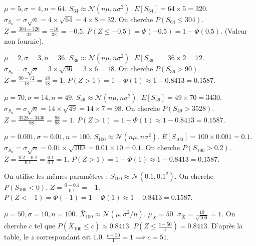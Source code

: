 \begin{correctionbox}
$\mu=5, \sigma=4, n=64$. $S_{64} \approx \mathcal{N}(n\mu, n\sigma^2)$.
$E[S_{64}] = 64 \times 5 = 320$.
$\sigma_{S_n} = \sigma\sqrt{n} = 4 \times \sqrt{64} = 4 \times 8 = 32$.
On cherche $P(S_{64} \le 304)$.
$Z = \frac{304 - 320}{32} = \frac{-16}{32} = -0.5$.
$P(Z \le -0.5) = \Phi(-0.5) = 1 - \Phi(0.5)$. (Valeur non fournie).
\end{correctionbox}

\begin{correctionbox}
$\mu=2, \sigma=3, n=36$. $S_{36} \approx \mathcal{N}(n\mu, n\sigma^2)$.
$E[S_{36}] = 36 \times 2 = 72$.
$\sigma_{S_n} = \sigma\sqrt{n} = 3 \times \sqrt{36} = 3 \times 6 = 18$.
On cherche $P(S_{36} > 90)$.
$Z = \frac{90 - 72}{18} = \frac{18}{18} = 1$.
$P(Z > 1) = 1 - \Phi(1) \approx 1 - 0.8413 = 0.1587$.
\end{correctionbox}

\begin{correctionbox}
$\mu=70, \sigma=14, n=49$. $S_{49} \approx \mathcal{N}(n\mu, n\sigma^2)$.
$E[S_{49}] = 49 \times 70 = 3430$.
$\sigma_{S_n} = \sigma\sqrt{n} = 14 \times \sqrt{49} = 14 \times 7 = 98$.
On cherche $P(S_{49} > 3528)$.
$Z = \frac{3528 - 3430}{98} = \frac{98}{98} = 1$.
$P(Z > 1) = 1 - \Phi(1) \approx 1 - 0.8413 = 0.1587$.
\end{correctionbox}

\begin{correctionbox}
$\mu=0.001, \sigma=0.01, n=100$. $S_{100} \approx \mathcal{N}(n\mu, n\sigma^2)$.
$E[S_{100}] = 100 \times 0.001 = 0.1$.
$\sigma_{S_n} = \sigma\sqrt{n} = 0.01 \times \sqrt{100} = 0.01 \times 10 = 0.1$.
On cherche $P(S_{100} > 0.2)$.
$Z = \frac{0.2 - 0.1}{0.1} = \frac{0.1}{0.1} = 1$.
$P(Z > 1) = 1 - \Phi(1) \approx 1 - 0.8413 = 0.1587$.
\end{correctionbox}

\begin{correctionbox}
On utilise les mêmes paramètres : $S_{100} \approx \mathcal{N}(0.1, 0.1^2)$.
On cherche $P(S_{100} < 0)$.
$Z = \frac{0 - 0.1}{0.1} = -1$.
$P(Z < -1) = \Phi(-1) = 1 - \Phi(1) \approx 1 - 0.8413 = 0.1587$.
\end{correctionbox}

\begin{correctionbox}
$\mu=50, \sigma=10, n=100$. $\bar{X}_{100} \approx \mathcal{N}(\mu, \sigma^2/n)$.
$\mu_{\bar{X}} = 50$. $\sigma_{\bar{X}} = \frac{10}{\sqrt{100}} = 1$.
On cherche $c$ tel que $P(\bar{X}_{100} \le c) \approx 0.8413$.
$P(Z \le \frac{c - 50}{1}) = 0.8413$.
D'après la table, le $z$ correspondant est $1.0$.
$\frac{c - 50}{1} = 1 \implies c = 51$.
\end{correctionbox}

